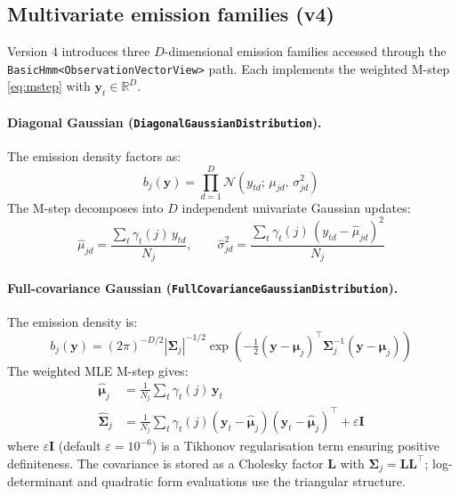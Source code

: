 \documentclass[11pt]{article}
\begin{document}
\subsection{Multivariate emission families (v4)}
\label{sec:mvmsteps}

Version 4 introduces three $D$-dimensional emission families accessed
through the \texttt{BasicHmm<}\texttt{ObservationVectorView>} path.
Each implements the weighted M-step \eqref{eq:mstep} with
$\mathbf{y}_t \in \mathbb{R}^D$.

\paragraph{Diagonal Gaussian (\texttt{DiagonalGaussianDistribution}).}
The emission density factors as:
\begin{equation}
  b_j(\mathbf{y}) = \prod_{d=1}^D \mathcal{N}(y_{td};\, \mu_{jd},\, \sigma_{jd}^2)
\end{equation}
The M-step decomposes into $D$ independent univariate Gaussian updates:
\begin{equation}
  \hat{\mu}_{jd} = \frac{\sum_t \gamma_t(j)\, y_{td}}{N_j},
  \qquad
  \hat{\sigma}_{jd}^2 = \frac{\sum_t \gamma_t(j)\,(y_{td} - \hat{\mu}_{jd})^2}{N_j}
\end{equation}

\paragraph{Full-covariance Gaussian (\texttt{FullCovarianceGaussianDistribution}).}
The emission density is:
\begin{equation}
  b_j(\mathbf{y}) = (2\pi)^{-D/2}|\boldsymbol{\Sigma}_j|^{-1/2}
    \exp\!\left(-\tfrac{1}{2}(\mathbf{y}-\boldsymbol{\mu}_j)^\top
    \boldsymbol{\Sigma}_j^{-1}(\mathbf{y}-\boldsymbol{\mu}_j)\right)
\end{equation}
The weighted MLE M-step gives:
\begin{align}
  \hat{\boldsymbol{\mu}}_j &= \frac{1}{N_j}\sum_t \gamma_t(j)\,\mathbf{y}_t \\
  \hat{\boldsymbol{\Sigma}}_j &= \frac{1}{N_j}\sum_t \gamma_t(j)
    (\mathbf{y}_t - \hat{\boldsymbol{\mu}}_j)(\mathbf{y}_t - \hat{\boldsymbol{\mu}}_j)^\top
    + \varepsilon\mathbf{I}
\end{align}
where $\varepsilon\mathbf{I}$ (default $\varepsilon = 10^{-6}$) is a Tikhonov
regularisation term ensuring positive definiteness.
The covariance is stored as a Cholesky factor $\mathbf{L}$ with
$\boldsymbol{\Sigma}_j = \mathbf{L}\mathbf{L}^\top$; log-determinant and
quadratic form evaluations use the triangular structure.
\end{document}
